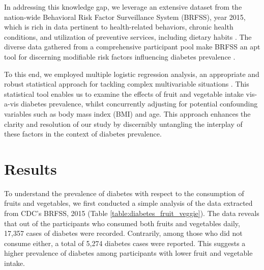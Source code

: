\documentclass[11pt]{article}
\begin{document}
In addressing this knowledge gap, we leverage an extensive dataset from the nation-wide Behavioral Risk Factor Surveillance System (BRFSS), year 2015, which is rich in data pertinent to health-related behaviors, chronic health conditions, and utilization of preventive services, including dietary habits \cite{Caceres2019AssessingGI, Ford2008GenderDI}. The diverse data gathered from a comprehensive participant pool make BRFSS an apt tool for discerning modifiable risk factors influencing diabetes prevalence \cite{Iachan2016NationalWO, McEwen2013AnalysisOB}.

To this end, we employed multiple logistic regression analysis, an appropriate and robust statistical approach for tackling complex multivariable situations \cite{Cohen1979AppliedMR, Sperandei2014UnderstandingLR}. This statistical tool enables us to examine the effects of fruit and vegetable intake vis-a-vis diabetes prevalence, whilst concurrently adjusting for potential confounding variables such as body mass index (BMI) and age. This approach enhances the clarity and resolution of our study by discernibly untangling the interplay of these factors in the context of diabetes prevalence.

\section*{Results}

To understand the prevalence of diabetes with respect to the consumption of fruits and vegetables, we first conducted a simple analysis of the data extracted from CDC's BRFSS, 2015 (Table \ref{table:diabetes_fruit_veggie}). The data reveals that out of the participants who consumed both fruits and vegetables daily, 17,357 cases of diabetes were recorded. Contrarily, among those who did not consume either, a total of 5,274 diabetes cases were reported. This suggests a higher prevalence of diabetes among participants with lower fruit and vegetable intake. 
\end{document}
